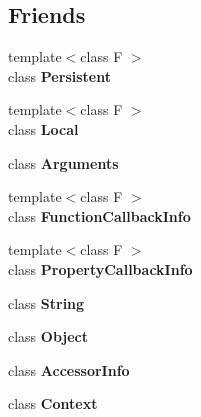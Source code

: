 \subsection*{Friends}
\begin{DoxyCompactItemize}
\item 
\hypertarget{classv8_1_1_handle_afaadbbd2553180545a4e018c3eeac71e}{}{\footnotesize template$<$class F $>$ }\\class {\bfseries Persistent}\label{classv8_1_1_handle_afaadbbd2553180545a4e018c3eeac71e}

\item 
\hypertarget{classv8_1_1_handle_afb872edb4aac7ba55f0da004113aa2b0}{}{\footnotesize template$<$class F $>$ }\\class {\bfseries Local}\label{classv8_1_1_handle_afb872edb4aac7ba55f0da004113aa2b0}

\item 
\hypertarget{classv8_1_1_handle_acbd2a21b98cd2cb694fd02340724b625}{}class {\bfseries Arguments}\label{classv8_1_1_handle_acbd2a21b98cd2cb694fd02340724b625}

\item 
\hypertarget{classv8_1_1_handle_a76786e6fa2d0eac5e2d4f647659d0d23}{}{\footnotesize template$<$class F $>$ }\\class {\bfseries Function\+Callback\+Info}\label{classv8_1_1_handle_a76786e6fa2d0eac5e2d4f647659d0d23}

\item 
\hypertarget{classv8_1_1_handle_a5018adab21fade2b42f4f60e45fa1083}{}{\footnotesize template$<$class F $>$ }\\class {\bfseries Property\+Callback\+Info}\label{classv8_1_1_handle_a5018adab21fade2b42f4f60e45fa1083}

\item 
\hypertarget{classv8_1_1_handle_a7fb804f7dc96dd9f705c84095f37f1ca}{}class {\bfseries String}\label{classv8_1_1_handle_a7fb804f7dc96dd9f705c84095f37f1ca}

\item 
\hypertarget{classv8_1_1_handle_a0720b5f434e636e22a3ed34f847eec57}{}class {\bfseries Object}\label{classv8_1_1_handle_a0720b5f434e636e22a3ed34f847eec57}

\item 
\hypertarget{classv8_1_1_handle_aa6da8bc2cce791f1f1358707f98c45d1}{}class {\bfseries Accessor\+Info}\label{classv8_1_1_handle_aa6da8bc2cce791f1f1358707f98c45d1}

\item 
\hypertarget{classv8_1_1_handle_ac26c806e60ca4a0547680edb68f6e39b}{}class {\bfseries Context}\label{classv8_1_1_handle_ac26c806e60ca4a0547680edb68f6e39b}


\end{DoxyCompactItemize}

